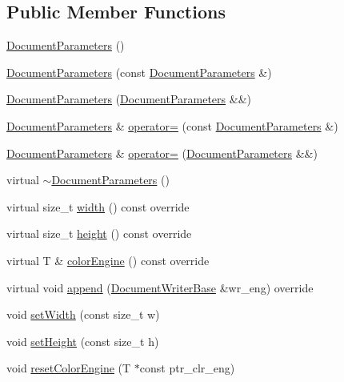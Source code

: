 \subsection*{Public Member Functions}
\begin{DoxyCompactItemize}
\item 
\hyperlink{classGraphicalEditorCore_1_1DocumentParameters_a2f886f265cbb7c548763142c05daa7f9}{Document\+Parameters} ()
\item 
\hyperlink{classGraphicalEditorCore_1_1DocumentParameters_af51920612aedf38f46b341b675f6f271}{Document\+Parameters} (const \hyperlink{classGraphicalEditorCore_1_1DocumentParameters}{Document\+Parameters} \&)
\item 
\hyperlink{classGraphicalEditorCore_1_1DocumentParameters_a3fc1cb785673903106dce2a4c6d47875}{Document\+Parameters} (\hyperlink{classGraphicalEditorCore_1_1DocumentParameters}{Document\+Parameters} \&\&)
\item 
\hyperlink{classGraphicalEditorCore_1_1DocumentParameters}{Document\+Parameters} \& \hyperlink{classGraphicalEditorCore_1_1DocumentParameters_ab4603c9baf2d76b9405fd099572546f4}{operator=} (const \hyperlink{classGraphicalEditorCore_1_1DocumentParameters}{Document\+Parameters} \&)
\item 
\hyperlink{classGraphicalEditorCore_1_1DocumentParameters}{Document\+Parameters} \& \hyperlink{classGraphicalEditorCore_1_1DocumentParameters_a635d305147d085a54281dd135601afa9}{operator=} (\hyperlink{classGraphicalEditorCore_1_1DocumentParameters}{Document\+Parameters} \&\&)
\item 
virtual \hyperlink{classGraphicalEditorCore_1_1DocumentParameters_a390ce6cb3be137d584bb7c74965325b7}{$\sim$\+Document\+Parameters} ()
\item 
virtual size\+\_\+t \hyperlink{classGraphicalEditorCore_1_1DocumentParameters_a96834b7081ba4001cf0c8a38532f3a48}{width} () const override
\item 
virtual size\+\_\+t \hyperlink{classGraphicalEditorCore_1_1DocumentParameters_ab1a929a3638767bbb361e9a7c69e9374}{height} () const override
\item 
virtual T \& \hyperlink{classGraphicalEditorCore_1_1DocumentParameters_a49010b1753c4a62a46bf01da20f17e61}{color\+Engine} () const override
\item 
virtual void \hyperlink{classGraphicalEditorCore_1_1DocumentParameters_a5970a79e783f85042786150e32fba8c5}{append} (\hyperlink{classGraphicalEditorCore_1_1DocumentWriterBase}{Document\+Writer\+Base} \&wr\+\_\+eng) override
\item 
void \hyperlink{classGraphicalEditorCore_1_1DocumentParameters_a1b982f66a9fd844c3ecbba465bf85ad1}{set\+Width} (const size\+\_\+t w)
\item 
void \hyperlink{classGraphicalEditorCore_1_1DocumentParameters_a399ffb889b05829955ed0ab4020408ef}{set\+Height} (const size\+\_\+t h)
\item 
void \hyperlink{classGraphicalEditorCore_1_1DocumentParameters_afdd4ea9fd33458fdfdb125b286a75344}{reset\+Color\+Engine} (T $\ast$const ptr\+\_\+clr\+\_\+eng)
\end{DoxyCompactItemize}


